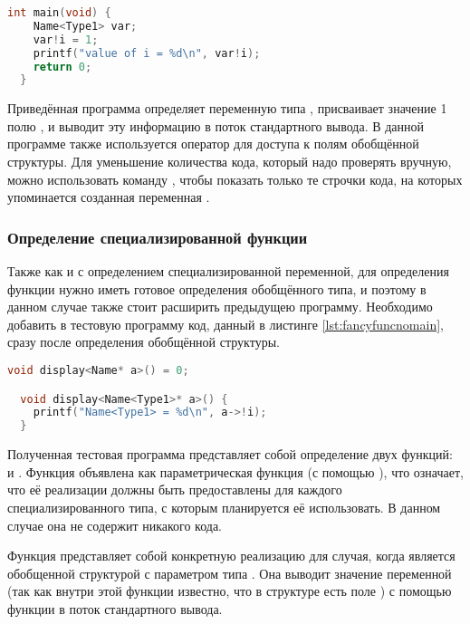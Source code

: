 \begin{lstlisting}[language=c, caption={Изменённая функция main}, label={lst:fancystructonlymain}]
  int main(void) {
    Name<Type1> var;
    var!i = 1;
    printf("value of i = %d\n", var!i);
    return 0;
  }
\end{lstlisting}

Приведённая программа определяет переменную  типа ,
присваивает значение 1 полю , и выводит эту информацию в поток стандартного вывода.
В данной программе также используется оператор \cmd{!} для доступа к полям обобщённой структуры.
Для уменьшение количества кода, который надо проверять вручную, можно использовать команду ,
чтобы показать только те строчки кода, на которых упоминается созданная переменная
.

\subsubsection{Определение специализированной функции}
Также как и с определением специализированной переменной, для определения функции нужно иметь готовое определения обобщённого типа,
и поэтому в данном случае также стоит расширить предыдущею программу.
Необходимо добавить в тестовую программу код, данный в листинге \ref{lst:fancyfuncnomain}, сразу после определения обобщённой структуры.

\begin{lstlisting}[language=c, caption={Определение специализированной функции}, label={lst:fancyfuncnomain}]
  void display<Name* a>() = 0;

  void display<Name<Type1>* a>() {
    printf("Name<Type1> = %d\n", a->!i);
  }
\end{lstlisting}

Полученная тестовая программа представляет собой определение двух функций:  и .
Функция  объявлена как параметрическая функция (с помощью ), что означает, что её реализации должны быть предоставлены для каждого специализированного типа, с которым планируется её использовать.
В данном случае она не содержит никакого кода.

Функция  представляет собой конкретную реализацию для случая, когда  является обобщенной структурой с параметром типа .
Она выводит значение переменной  (так как внутри этой функции известно, что в структуре  есть поле ) с помощью функции  в поток стандартного вывода.

